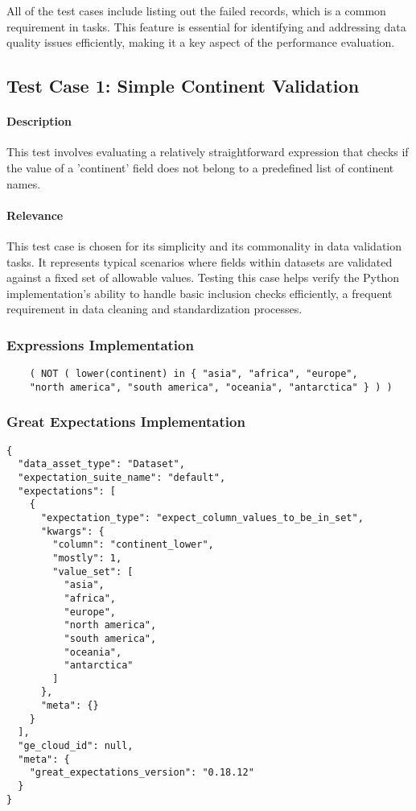 All of the test cases include listing out the failed records, which is a common requirement in  tasks. This feature is essential for identifying and addressing data quality issues efficiently, making it a key aspect of the performance evaluation.

\subsection{Test Case 1: Simple Continent Validation}

\paragraph{Description} This test involves evaluating a relatively straightforward expression that checks if the value of a 'continent' field does not belong to a predefined list of continent names. 

\paragraph{Relevance} This test case is chosen for its simplicity and its commonality in data validation tasks. It represents typical scenarios where fields within datasets are validated against a fixed set of allowable values. Testing this case helps verify the Python implementation’s ability to handle basic inclusion checks efficiently, a frequent requirement in data cleaning and standardization processes.

\subsubsection{Expressions Implementation}

\begin{verbatim}
    ( NOT ( lower(continent) in { "asia", "africa", "europe", 
    "north america", "south america", "oceania", "antarctica" } ) )
\end{verbatim}

\subsubsection{Great Expectations Implementation}

\begin{verbatim}
{
  "data_asset_type": "Dataset",
  "expectation_suite_name": "default",
  "expectations": [
    {
      "expectation_type": "expect_column_values_to_be_in_set",
      "kwargs": {
        "column": "continent_lower",
        "mostly": 1,
        "value_set": [
          "asia",
          "africa",
          "europe",
          "north america",
          "south america",
          "oceania",
          "antarctica"
        ]
      },
      "meta": {}
    }
  ],
  "ge_cloud_id": null,
  "meta": {
    "great_expectations_version": "0.18.12"
  }
}
\end{verbatim}

